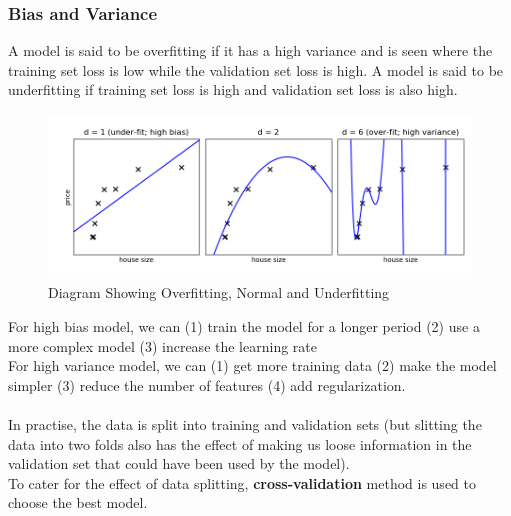 \documentclass[12pt,a4paper,titlepage,landscape]{book}
\begin{document}
	\subsubsection{Bias and Variance}
	A model is said to be overfitting  if it has a high variance and is seen where the training set loss is low while the validation set loss is high. A model is said to be underfitting if training set loss is high and validation set loss is also high.
	
	\begin{figure}
		\centering
		\includegraphics[width=\linewidth, height=0.5\textheight]{bias_variance}
		\caption[]{Diagram Showing Overfitting, Normal and Underfitting\protect\footnotemark}
		\label{fig:biasvariance}
	\end{figure}

	
	For high bias model, we can (1) train the model for a longer period (2) use a more complex model (3) increase the learning rate\\
	For high variance model, we can (1) get more training data (2) make the model simpler (3) reduce the number of features (4) add regularization. \\\\
	In practise, the data is split into training and validation sets (but slitting the data into two folds also has the effect of making us loose information in the validation set that could have been used by the model). \\
	
	To cater for the effect of data splitting, \textbf{cross-validation} method is used to choose the best model.
	
\end{document}
